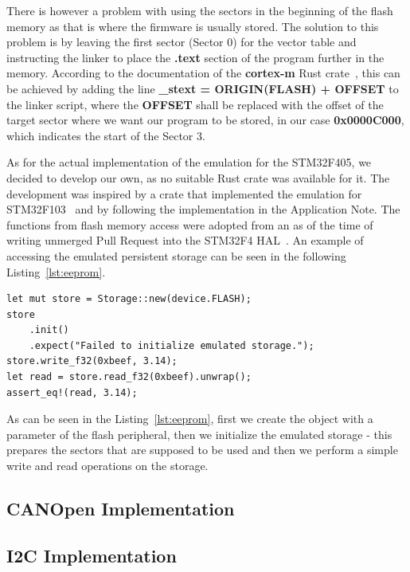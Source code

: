 There is however a problem with using the sectors in the beginning of the flash memory as that is where the firmware is usually stored.
The solution to this problem is by leaving the first sector (Sector 0) for the vector table and instructing the linker to place the \textbf{.text} section of the program further in the memory.
According to the documentation of the \textbf{cortex-m} Rust crate~\cite{rust_embedded_devices_wg_rust-embeddedcortex-m_2021}, this can be achieved by adding the line \textbf{\_stext = ORIGIN(FLASH) + OFFSET} to the linker script, where the \textbf{OFFSET} shall be replaced with the offset of the target sector where we want our program to be stored, in our case \textbf{0x0000C000}, which indicates the start of the Sector 3.

As for the actual implementation of the emulation for the STM32F405, we decided to develop our own, as no suitable Rust crate was available for it.
The development was inspired by a crate that implemented the emulation for STM32F103~\cite{dubrov_idubroveeprom_2020} and by following the implementation in the Application Note.
The functions from flash memory access were adopted from an as of the time of writing unmerged Pull Request into the STM32F4 HAL~\cite{astro_implement_2020}.
An example of accessing the emulated persistent storage can be seen in the following Listing~\ref{lst:eeprom}.

\begin{lstlisting}[caption={An example use of the emulated persistent storage.},label=lst:eeprom]
let mut store = Storage::new(device.FLASH);
store
    .init()
    .expect("Failed to initialize emulated storage.");
store.write_f32(0xbeef, 3.14);
let read = store.read_f32(0xbeef).unwrap();
assert_eq!(read, 3.14);
\end{lstlisting}

As can be seen in the Listing~\ref{lst:eeprom}, first we create the object with a parameter of the flash peripheral, then we initialize the emulated storage - this prepares the sectors that are supposed to be used and then we perform a simple write and read operations on the storage.


\subsection{CANOpen Implementation}
\label{subsec:canopen_impl}

\subsection{I2C Implementation}
\label{subsec:i2c_impl}

